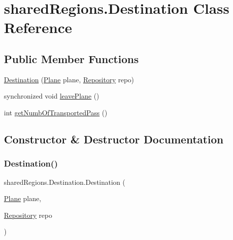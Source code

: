 \hypertarget{classshared_regions_1_1_destination}{}\section{shared\+Regions.\+Destination Class Reference}
\label{classshared_regions_1_1_destination}
\subsection*{Public Member Functions}
\begin{DoxyCompactItemize}
\item 
\hyperlink{classshared_regions_1_1_destination_a6e5faa10d3cf042c9775baf38f7db0d8}{Destination} (\hyperlink{classshared_regions_1_1_plane}{Plane} plane, \hyperlink{classshared_regions_1_1_repository}{Repository} repo)
\item 
synchronized void \hyperlink{classshared_regions_1_1_destination_a92d8a597465d7cb29ac87a41407794e7}{leave\+Plane} ()
\item 
int \hyperlink{classshared_regions_1_1_destination_ac2be96efc235a7cc7e6c7497e37bbe30}{get\+Numb\+Of\+Transported\+Pass} ()
\end{DoxyCompactItemize}


\subsection{Constructor \& Destructor Documentation}
\mbox{\label{classshared_regions_1_1_destination_a6e5faa10d3cf042c9775baf38f7db0d8}} 
\subsubsection{\texorpdfstring{Destination()}{Destination()}}
{\footnotesize\ttfamily shared\+Regions.\+Destination.\+Destination (\begin{DoxyParamCaption}\item[{\hyperlink{classshared_regions_1_1_plane}{Plane}}]{plane,  }\item[{\hyperlink{classshared_regions_1_1_repository}{Repository}}]{repo }\end{DoxyParamCaption})}



